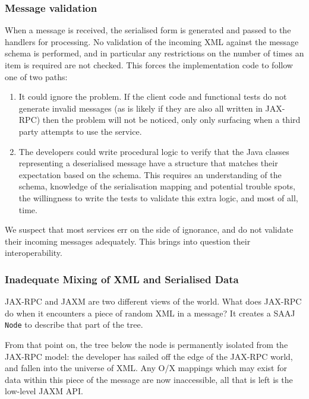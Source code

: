 \subsubsection{Message validation}
\label{objections:o-x:validation}

When a message is received, the serialised form is generated and
passed to the handlers for processing. No validation of the incoming
XML against the message schema is performed, and in particular any
restrictions on the number of times an item is required are not
checked. This forces the implementation code to follow one of two
paths:
\begin{enumerate}

\item It could ignore the problem. If the client code and functional
tests do not generate invalid messages (as is likely if they are also
all written in JAX-RPC) then the problem will not be noticed, only
only surfacing when a third party attempts to use the service.

\item The developers could write procedural logic to verify that
the Java classes representing a deserialised message have a
structure that matches their expectation based on the schema. This
requires an understanding of the schema, knowledge of the
serialisation mapping and potential trouble spots, the willingness to
write the tests to validate this extra logic, and most of all, time.

\end{enumerate}

We suspect that most services err on the side of ignorance, and do not
validate their incoming messages adequately. This brings into question
their interoperability.

\subsubsection{Inadequate Mixing of XML and Serialised Data}
\label{objections:o-x:mixing}

JAX-RPC and JAXM are two different views of the world. What does JAX-RPC
do when it encounters a piece of random XML in a message? It creates a
SAAJ {\tt Node} to describe that part of the tree.

From that point on, the tree below the node is permanently isolated
from the JAX-RPC model: the developer has sailed off the edge of the
JAX-RPC world, and fallen into the universe of XML. Any O/X mappings
which may exist for data within this piece of the message are now
inaccessible, all that is left is the low-level JAXM API. 

